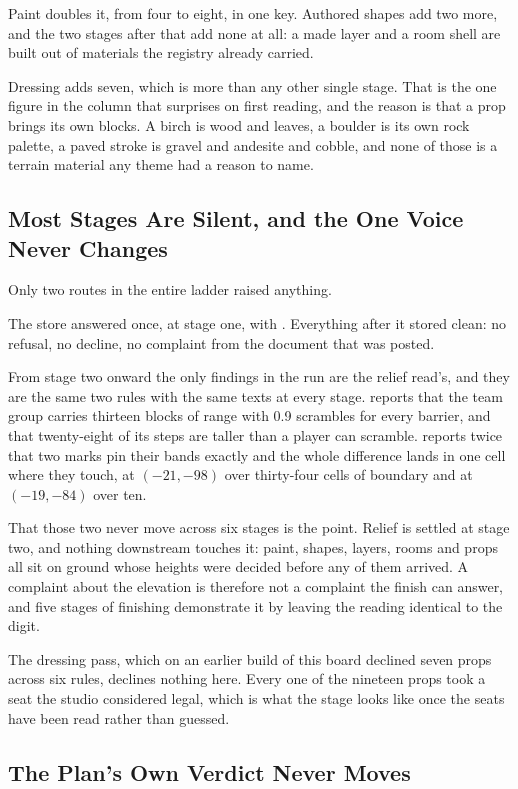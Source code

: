 Paint doubles it, from four to eight, in one key. Authored shapes add two more, and
the two stages after that add none at all: a made layer and a room shell are built
out of materials the registry already carried.

Dressing adds seven, which is more than any other single stage. That is the one
figure in the column that surprises on first reading, and the reason is that a
prop brings its own blocks. A birch is wood and leaves, a boulder is its own rock
palette, a paved stroke is gravel and andesite and cobble, and none of those is a
terrain material any theme had a reason to name.

\subsection{Most Stages Are Silent, and the One Voice Never Changes}

Only two routes in the entire ladder raised anything.

The store answered once, at stage one, with . Everything after it stored
clean: no refusal, no decline, no complaint from the document that was posted.

From stage two onward the only findings in the run are the relief read's, and they
are the same two rules with the same texts at every stage.  reports that
the team group carries thirteen blocks of range with 0.9 scrambles for every
barrier, and that twenty-eight of its steps are taller than a player can scramble.
 reports twice that two marks pin their bands exactly and the whole
difference lands in one cell where they touch, at $(-21,-98)$ over thirty-four
cells of boundary and at $(-19,-84)$ over ten.

That those two never move across six stages is the point. Relief is settled at
stage two, and nothing downstream touches it: paint, shapes, layers, rooms and
props all sit on ground whose heights were decided before any of them arrived.
A complaint about the elevation is therefore not a complaint the finish can
answer, and five stages of finishing demonstrate it by leaving the reading
identical to the digit.

The dressing pass, which on an earlier build of this board declined seven props
across six rules, declines nothing here. Every one of the nineteen props took a
seat the studio considered legal, which is what the stage looks like once the
seats have been read rather than guessed.

\subsection{The Plan's Own Verdict Never Moves}

